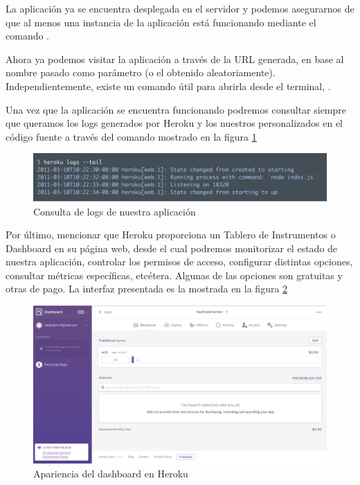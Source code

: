 La aplicación ya se encuentra desplegada en el servidor y podemos asegurarnos de que al menos una instancia de la aplicación está funcionando mediante el comando .

Ahora ya podemos visitar la aplicación a través de la URL generada, en base al nombre pasado como parámetro (o el obtenido aleatoriamente). Independientemente, existe un comando útil para abrirla desde el terminal, .

Una vez que la aplicación se encuentra funcionando podremos consultar siempre que queramos los logs generados por Heroku y los nuestros personalizados en el código fuente a través del comando mostrado en la figura \ref{fig:logs}

 \begin{figure}[H] \centering
    \includegraphics[width=15cm]{graphs/herokuLogs.png} \caption{Consulta de logs de nuestra aplicación \cite{heroku}}\label{fig:logs}
\end{figure}

Por último, mencionar que Heroku proporciona un Tablero de Instrumentos o Dashboard en su página web, desde el cual podremos monitorizar el estado de nuestra aplicación, controlar los permisos de acceso, configurar distintas opciones, consultar métricas específicas, etcétera. Algunas de las opciones son gratuitas y otras de pago. La interfaz presentada es la mostrada en la figura \ref{fig:dashboard}

 \begin{figure}[H] \centering
 	\includegraphics[width=15cm]{graphs/herokuDashboard.png} \caption{Apariencia del dashboard en Heroku \cite{heroku}}\label{fig:dashboard}
 \end{figure}

\chapterend
